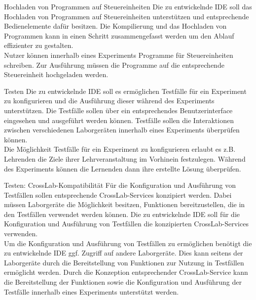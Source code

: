 \begin{requirement}{Hochladen von Programmen auf Steuereinheiten}
    \reqdescription Die zu entwickelnde IDE soll das Hochladen von Programmen auf Steuereinheiten unterstützen und entsprechende Bedienelemente dafür besitzen. Die Kompilierung und das Hochladen von Programmen kann in einen Schritt zusammengefasst werden um den Ablauf effizienter zu gestalten. \\
    \reqrationale Nutzer können innerhalb eines Experiments Programme für Steuereinheiten schreiben. Zur Ausführung müssen die Programme auf die entsprechende Steuereinheit hochgeladen werden.  \\
\end{requirement}

\begin{requirement}{Testen}
    \reqdescription Die zu entwickelnde IDE soll es ermöglichen Testfälle für ein Experiment zu konfigurieren und die Ausführung dieser während des Experiments unterstützen. Die Testfälle sollen über ein entsprechendes Benutzerinterface eingesehen und ausgeführt werden können. Testfälle sollen die Interaktionen zwischen verschiedenen Laborgeräten innerhalb eines Experiments überprüfen können. \\
    \reqrationale Die Möglichkeit Testfälle für ein Experiment zu konfigurieren erlaubt es z.B. Lehrenden die Ziele ihrer Lehrveranstaltung im Vorhinein festzulegen. Während des Experiments können die Lernenden dann ihre erstellte Lösung überprüfen. \\
\end{requirement}

\begin{requirement}{Testen: CrossLab-Kompatibilität}
    \reqdescription Für die Konfiguration und Ausführung von Testfällen sollen entsprechende CrossLab-Services konzipiert werden. Dabei müssen Laborgeräte die Möglichkeit besitzen, Funktionen bereitzustellen, die in den Testfällen verwendet werden können. Die zu entwickelnde IDE soll für die Konfiguration und Ausführung von Testfällen die konzipierten CrossLab-Services verwenden. \\
    \reqrationale Um die Konfiguration und Ausführung von Testfällen zu ermöglichen benötigt die zu entwickelnde IDE ggf. Zugriff auf andere Laborgeräte. Dies kann seitens der Laborgeräte durch die Bereitstellung von Funktionen zur Nutzung in Testfällen ermöglicht werden. Durch die Konzeption entsprechender CrossLab-Service kann die Bereitstellung der Funktionen sowie die Konfiguration und Ausführung der Testfälle innerhalb eines Experiments unterstützt werden. \\
\end{requirement}

